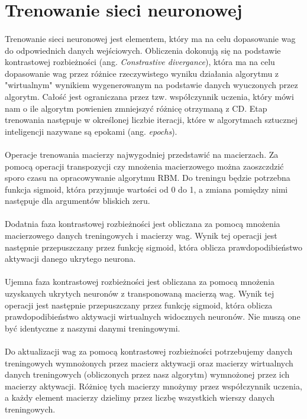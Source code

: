 \section{Trenowanie sieci neuronowej}
    \paragraph{}
        Trenowanie sieci neuronowej jest elementem, który ma na celu dopasowanie wag do odpowiednich danych wejściowych.
        Obliczenia dokonują się na podstawie kontrastowej rozbieżności (ang. \textit{Constrastive divergance}), która ma na celu
        dopasowanie wag przez różnice rzeczywistego wyniku działania algorytmu z "wirtualnym" wynikiem wygenerowanym na
        podstawie danych wyuczonych przez algorytm. Całość jest ograniczana przez tzw. współczynnik uczenia, który mówi
        nam o ile algorytm powienien zmniejszyć różnicę otrzymaną z CD. Etap trenowania następuje w określonej liczbie iteracji, które w 				 algorytmach sztucznej inteligencji nazywane są epokami 
	 (ang. \textit{epochs}). 
    \paragraph{}
       Operacje trenowania macierzy najwygodniej przedstawić na macierzach. Za pomocą operacji transpozycji czy mnożenia
       macierzowego można zaoszczdzić sporo czasu na opracowywanie algorytmu RBM. Do treningu będzie potrzebna funkcja sigmoid,
       która przyjmuje wartości od 0 do 1,  a zmiana pomiędzy nimi następuje dla argumentów bliskich zeru.
    \paragraph{}
	 Dodatnia faza kontrastowej rozbieżności jest obliczana za pomocą mnożenia macierzowego danych treningowych i macierzy wag. 
	 Wynik tej operacji jest następnie przepuszczany przez funkcję sigmoid, która oblicza prawdopodibieństwo aktywacji danego ukrytego 			 neurona.
    \paragraph{}
	 Ujemna faza kontrastowej rozbieżności jest obliczana za pomocą mnożenia uzyskanych ukrytych neuronów z transponowaną 
	 macierzą wag. Wynik tej operacji jest następnie przepuszczany przez funkcję sigmoid, która oblicza prawdopodibieństwo aktywacji 	 			 wirtualnych widocznych neuronów. Nie muszą one być identyczne z naszymi danymi treningowymi.
    \paragraph{}
	 Do aktualizacji wag za pomocą kontrastowej rozbieżności potrzebujemy danych treningowych wymnożonych przez macierz aktywacji 
	 oraz macierzy wirtualnych danych treningowych (obliczonych przez nasz algorytm) wymnożonej przez ich macierzy aktywacji. 
	 Różnicę tych macierzy mnożymy przez współczynnik uczenia, a każdy element macierzy dzielimy przez liczbę wszystkich wierszy danych 		 treningowych.
